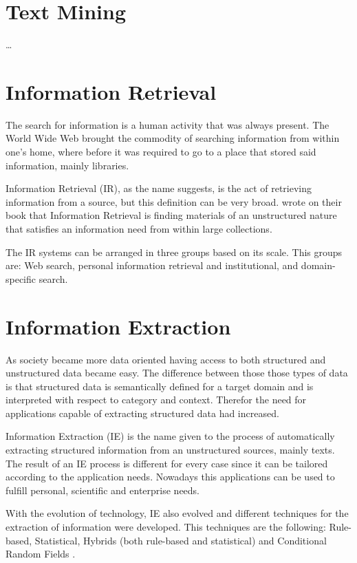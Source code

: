 \section{Text Mining}

\dots

\section{Information Retrieval}

The search for information is a human activity that was always present.
The World Wide Web brought the commodity of searching information from within one's home, where before it was required to go to a place that stored said information, mainly libraries.

Information Retrieval (IR), as the name suggests, is the act of retrieving information from a source, but this definition can be very broad.
\textcite{manning_2008} wrote on their book that Information Retrieval is finding materials of an unstructured nature that satisfies an information need from within large collections.

The IR systems can be arranged in three groups based on its scale.
This groups are: Web search, personal information retrieval and institutional, and domain-specific search.

\section{Information Extraction}

As society became more data oriented having access to both structured and unstructured data became easy.
The difference between those those types of data is that structured data is semantically defined for a target domain and is interpreted with respect to category and context.
Therefor the need for applications capable of extracting structured data had increased.

Information Extraction (IE) is the name given to the process of automatically extracting structured information from an unstructured sources, mainly texts.
The result of an IE process is different for every case since it can be tailored according to the application needs.
Nowadays this applications can be used to fulfill personal, scientific and enterprise needs.

With the evolution of technology, IE also evolved and different techniques for the extraction of information were developed.
This techniques are the following: Rule-based, Statistical, Hybrids (both rule-based and statistical) and Conditional Random Fields \autocite{sarawagi_2008}.


